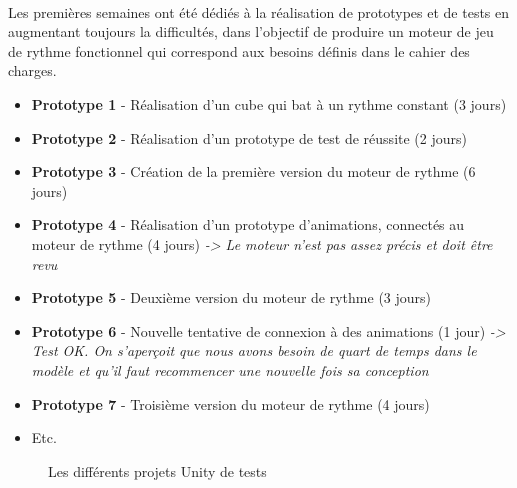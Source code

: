 \paragraph{}
Les premières semaines ont été dédiés à la réalisation de prototypes et de tests en augmentant toujours la difficultés, dans l’objectif de produire un moteur de jeu de rythme fonctionnel qui correspond aux besoins définis dans le cahier des charges.

\begin{itemize}
\item \textbf{Prototype 1} - Réalisation d’un cube qui bat à un rythme constant (3 jours)
\item \textbf{Prototype 2} - Réalisation d’un prototype de test de réussite (2 jours)
\item \textbf{Prototype 3} - Création de la première version du moteur de rythme (6 jours)
\item \textbf{Prototype 4} - Réalisation d’un prototype d’animations, connectés au moteur de rythme (4 jours) \emph{-> Le moteur n’est pas assez précis et doit être revu}
\item \textbf{Prototype 5} - Deuxième version du moteur de rythme (3 jours)
\item \textbf{Prototype 6} - Nouvelle tentative de connexion à des animations (1 jour) \emph{-> Test OK. On s’aperçoit que nous avons besoin de quart de temps dans le modèle et qu’il faut recommencer une nouvelle fois sa conception}
\item \textbf{Prototype 7} - Troisième version du moteur de rythme (4 jours)
\item Etc.
\end{itemize}

\begin{figure}[H]\centering
  \caption{Les différents projets Unity de tests}
  \label{listte}
\end{figure}

